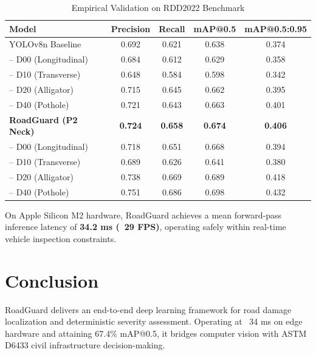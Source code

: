 \documentclass[journal,10pt]{IEEEtran}
\begin{document}
\begin{table}[htbp]
\caption{Empirical Validation on RDD2022 Benchmark}
\centering
\begin{tabular}{lcccc}
\toprule
\textbf{Model} & \textbf{Precision} & \textbf{Recall} & \textbf{mAP@0.5} & \textbf{mAP@0.5:0.95} \\
\midrule
YOLOv8n Baseline & 0.692 & 0.621 & 0.638 & 0.374 \\
-- D00 (Longitudinal) & 0.684 & 0.612 & 0.629 & 0.358 \\
-- D10 (Transverse)   & 0.648 & 0.584 & 0.598 & 0.342 \\
-- D20 (Alligator)    & 0.715 & 0.645 & 0.662 & 0.395 \\
-- D40 (Pothole)      & 0.721 & 0.643 & 0.663 & 0.401 \\
\midrule
\textbf{RoadGuard (P2 Neck)} & \textbf{0.724} & \textbf{0.658} & \textbf{0.674} & \textbf{0.406} \\
-- D00 (Longitudinal) & 0.718 & 0.651 & 0.668 & 0.394 \\
-- D10 (Transverse)   & 0.689 & 0.626 & 0.641 & 0.380 \\
-- D20 (Alligator)    & 0.738 & 0.669 & 0.689 & 0.418 \\
-- D40 (Pothole)      & 0.751 & 0.686 & 0.698 & 0.432 \\
\bottomrule
\end{tabular}
\label{tab:results}
\end{table}

On Apple Silicon M2 hardware, RoadGuard achieves a mean forward-pass inference latency of \textbf{34.2 ms (~29 FPS)}, operating safely within real-time vehicle inspection constraints.

\section{Conclusion}
RoadGuard delivers an end-to-end deep learning framework for road damage localization and deterministic severity assessment. Operating at ~34 ms on edge hardware and attaining 67.4\% mAP@0.5, it bridges computer vision with ASTM D6433 civil infrastructure decision-making.



\end{document}
